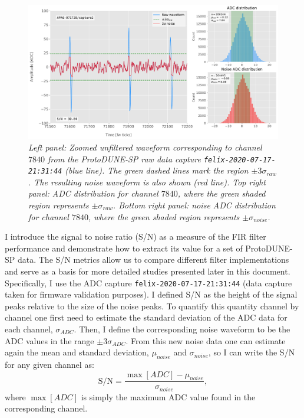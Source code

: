 \begin{figure}[t]
	\centering
	\includegraphics[width=1\linewidth]{Images/Matched_Filter/waveform_example_raw}
	\caption{\textit{Left panel: Zoomed unfiltered waveform corresponding to channel $7840$ from the ProtoDUNE-SP raw data capture \texttt{felix-2020-07-17-21:31:44} (blue line). The green dashed lines mark the region $\pm3\sigma_{raw}$. The resulting noise waveform is also shown (red line). Top right panel: ADC distribution for channel $7840$, where the green shaded region represents $\pm \sigma_{raw}$. Bottom right panel: noise ADC distribution for channel $7840$, where the green shaded region represents $\pm \sigma_{noise}$.}}
	\label{fig:adcs_nofir}
\end{figure}

I introduce the signal to noise ratio (S/N) as a measure of the FIR filter performance and demonstrate how to extract its value for a set of 
ProtoDUNE-SP data. The S/N metrics allow us to compare different filter implementations and serve as a basis for more detailed studies presented later in this document. Specifically, I use the ADC capture \texttt{felix-2020-07-17-21:31:44} (data capture taken for firmware validation purposes). I defined S/N as the height of the signal peaks relative to the size of the noise peaks. To quantify this quantity channel by channel one first need to estimate the standard deviation of the ADC data for each channel, $\sigma_{ADC}$. Then, I define the corresponding noise waveform to be the ADC values in the range $\pm 3 \sigma_{ADC}$. From this new noise data one can estimate again the mean and standard deviation, $\mu_{noise}$ and $\sigma_{noise}$, so I can write the S/N for any given channel as:
\begin{equation}
	\mathrm{S/N} = \frac{\max{[ADC]} - \mu_{noise}}{\sigma_{noise}},
\end{equation}
where $\max{[ADC]}$ is simply the maximum ADC value found in the corresponding channel.

